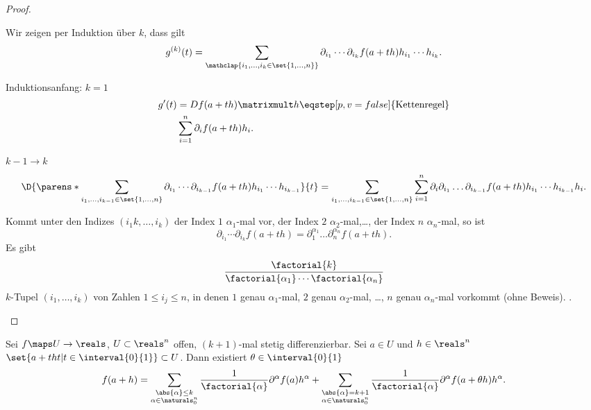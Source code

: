 \begin{proof}
  \begin{proofenumerate}
    \item Wir zeigen per Induktion über \( k \), dass gilt
    \begin{equation*}
      g^{(k)}(t)=\sum_{\mathclap{i_1,\dotsc,i_k\in \set{1,\dotsc,n}}}\partial_{i_1}\dotsb\partial_{i_k} f(a+th)h_{i_1}\dotsb h_{i_k}.
    \end{equation*}
    \begin{proofdescription}
      \item[Induktionsanfang: \( k=1 \)]
      \begin{align*}
        g'(t)&=Df(a+th)\matrixmult h\eqstep[p,v=false]{\text{Kettenregel}}\\
        &\sum_{i=1}^{n}\partial_i f(a+th) h_i.
      \end{align*}
      \item[\( k-1\to k \)]
      \begin{equation*}
        \D{\parens*{\sum_{i_1,\dotsc,i_{k-1}\in \set{1,\dotsc,n}}\partial_{i_1}\dotsb \partial_{i_{k-1}}f(a+th)h_{i_1}\dotsb h_{i_{k-1}}}}{t}=\sum_{i_1,\dotsc,i_{k-1}\in \set{1,\dots,n}} \sum_{i=1}^{n}\partial_i \partial_{i_1}\dotsc \partial_{i_{k-1}} f(a+th) h_{i_1}\dotsb h_{i_{k-1}}h_i.
      \end{equation*} 
    \end{proofdescription}
    \item Kommt unter den Indizes \( (i_1k,\dotsc,i_k) \) der Index \( 1 \) \( \alpha_1 \)-mal vor, der Index \( 2 \) \( \alpha_2 \)-mal,\dots, der Index \( n \) \( \alpha_n \)-mal, so ist 
    \begin{equation*}
      \partial_{i_1}\dotsb\partial_{i_k} f(a+th)=\partial_1^{\alpha_1}\dotsc \partial_n^{\alpha_n}f(a+th).
    \end{equation*}
    Es gibt 
    \begin{equation*}
      \frac{\factorial{k}}{\factorial{\alpha_1}\dotsb \factorial{\alpha_n}}
    \end{equation*}
    \( k \)-Tupel \( (i_1,\dotsc,i_k) \) von Zahlen \( 1\leq i_j\leq n \), in denen \( 1 \) genau \( \alpha_1 \)-mal, \( 2 \) genau \( \alpha_2 \)-mal, \dots, \( n \) genau \( \alpha_n \)-mal vorkommt (ohne Beweis). \timplies \Beh.
  \end{proofenumerate}
\end{proof}
\begin{satz}
  Sei \( f\maps U\to \reals \), \( U\subset \reals^n \) offen, \( (k+1) \)-mal stetig differenzierbar. Sei \( a\in U \) und \( h\in \reals^n \) \sd \( \set{a+tht|t\in \interval{0}{1}}\subset U \). Dann existiert \( \theta\in \interval{0}{1} \) \sd
  \begin{equation*}
    f(a+h)=\sum_{\substack{\abs{\alpha}\leq k\\ \alpha\in \naturals_0^n}}\frac{1}{\factorial{\alpha}} \partial^{\alpha} f(a) h^{\alpha} +\sum_{\substack{\abs{\alpha}=k+1\\ \alpha\in \naturals_0^{n}}} \frac{1}{\factorial{\alpha}} \partial^{\alpha} f(a+\theta h) h^{\alpha}.
  \end{equation*}
\end{satz}
